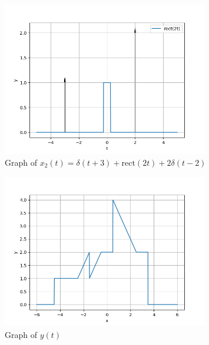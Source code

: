 \documentclass[journal,12pt,onecolumn]{IEEEtran}
\theoremstyle{remark}
\begin{document}
\begin{figure}[htbp]
    \centering
    \includegraphics[width=0.8\textwidth]{2023/EC/58/figs/gate_x2.png}
    \caption{Graph of \(x_2(t) = \delta(t+3) + \text{rect}(2t) + 2\delta(t-2)\)}
    \label{fig:x_2_graph}
\end{figure}


\begin{figure}[htbp]
    \centering
    \includegraphics[width=0.8\textwidth]{2023/EC/58/figs/gate_y.png}
    \caption{Graph of \(y(t)\)}
    \label{fig:x_2_graph}
\end{figure}
\end{document}
